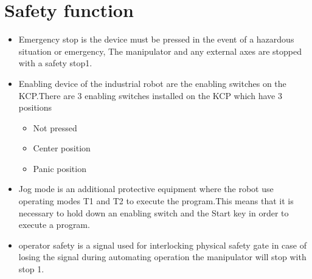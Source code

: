 \section{Safety function}
\begin{itemize}
    \item Emergency stop is the device must be pressed in the event of a hazardous situation or emergency, The manipulator and any external axes are stopped with a safety stop1.
   
    \item Enabling device of the industrial robot are the enabling switches on the
    KCP.There are 3 enabling switches installed on the KCP which have 3 positions
    \begin{itemize}
        \item Not pressed
        \item Center position
        \item Panic position
	 \end{itemize}
 
 \item Jog mode is an additional protective equipment where the robot use operating modes T1 and T2 to execute the program.This means that it is necessary to hold down an enabling switch and the Start key in order to execute a program.
 
 \item operator safety is a signal used for interlocking physical safety gate in case of losing the signal during automating operation the manipulator will stop with stop 1.
\end{itemize}